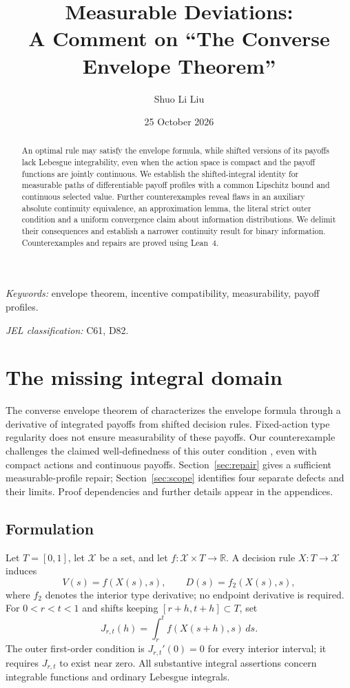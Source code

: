 \documentclass[11pt]{article}
\title{Measurable Deviations:\\ A Comment on ``The Converse Envelope Theorem''}
\author{Shuo Li Liu}
\date{25 October 2026}
\theoremstyle{remark}\newtheorem{remark}[theorem]{Remark}
\newcommand{\R}{\mathbb R}
\newcommand{\X}{\mathcal X}
\begin{document}
\maketitle
\begin{abstract}
An optimal rule may satisfy the envelope formula, while shifted versions of its payoffs lack Lebesgue integrability, even when the action space is compact and the payoff functions are jointly continuous. We establish the shifted-integral identity for measurable paths of differentiable payoff profiles with a common Lipschitz bound and continuous selected value. Further counterexamples reveal flaws in an auxiliary absolute continuity equivalence, an approximation lemma, the literal strict outer condition and a uniform convergence claim about information distributions. We delimit their consequences and establish a narrower continuity result for binary information. Counterexamples and repairs are proved using Lean~4.
\end{abstract}
\noindent\textit{Keywords:} envelope theorem, incentive compatibility, measurability, payoff profiles.\par
\noindent\textit{JEL classification:} C61, D82.

\section{The missing integral domain}
The converse envelope theorem of \citet{Sinander2022} characterizes the envelope formula through a derivative of integrated payoffs from shifted decision rules. Fixed-action type regularity does not ensure measurability of these payoffs. Our counterexample challenges the claimed well-definedness of this outer condition \citep[Section 1]{Sinander2022}, even with compact actions and continuous payoffs. Section~\ref{sec:repair} gives a sufficient measurable-profile repair; Section~\ref{sec:scope} identifies four separate defects and their limits. Proof dependencies and further details appear in the appendices.

\subsection{Formulation}
Let $T=[0,1]$, let $\X$ be a set, and let $f:\X\times T\to\R$. A decision rule $X:T\to\X$ induces
\[
 V(s)=f(X(s),s),\qquad D(s)=f_2(X(s),s),
\]
where $f_2$ denotes the interior type derivative; no endpoint derivative is required. For $0<r<t<1$ and shifts keeping $[r+h,t+h]\subset T$, set
\begin{equation}\label{eq:J}
 J_{r,t}(h)=\int_r^t f(X(s+h),s)\,ds.
\end{equation}
The outer first-order condition is $J_{r,t}'(0)=0$ for every interior interval; it requires $J_{r,t}$ to exist near zero. All substantive integral assertions concern integrable functions and ordinary Lebesgue integrals.
\end{document}
